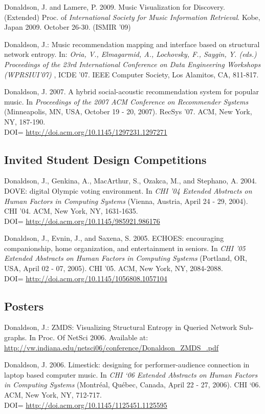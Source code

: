 \documentclass[overlapped,line,letterpaper]{res}
\begin{document}
\begin{resume}
Donaldson, J. and Lamere, P. 2009. Music Visualization for Discovery.  (Extended) Proc. of \emph{International Society for Music Information Retrieval}. Kobe, Japan 2009. October 26-30. (ISMIR '09)

Donaldson, J.: Music recommendation mapping and interface based on structural network entropy. In: \emph{Oria, V., Elmagarmid, A., Lochovsky, F., Saygin, Y. (eds.) Proceedings of the 23rd International Conference on Data Engineering Workshops (WPRSIUI'07) }, ICDE '07. IEEE Computer Society, Los Alamitos, CA, 811-817.

Donaldson, J. 2007. A hybrid social-acoustic recommendation system for popular music. In \emph{Proceedings of the 2007 ACM Conference on Recommender Systems} (Minneapolis, MN, USA, October 19 - 20, 2007). RecSys '07. ACM, New York, NY, 187-190.\\DOI= \url{http://doi.acm.org/10.1145/1297231.1297271}


\subsection{\bf Invited Student Design Competitions}
Donaldson, J., Genkina, A., MacArthur, S., Ozakca, M., and Stephano, A. 2004. DOVE: digital Olympic voting environment. In \emph{CHI '04 Extended Abstracts on Human Factors in Computing Systems} (Vienna, Austria, April 24 - 29, 2004). CHI '04. ACM, New York, NY, 1631-1635. \\DOI= \url{http://doi.acm.org/10.1145/985921.986176}

Donaldson, J., Evnin, J., and Saxena, S. 2005. ECHOES: encouraging companionship, home organization, and entertainment in seniors. In \emph{CHI '05 Extended Abstracts on Human Factors in Computing Systems} (Portland, OR, USA, April 02 - 07, 2005). CHI '05. ACM, New York, NY, 2084-2088. \\DOI= \url{http://doi.acm.org/10.1145/1056808.1057104}



\subsection{\bf Posters}
Donaldson, J.: ZMDS: Visualizing Structural Entropy in Queried Network Sub-graphs.   In Proc. Of NetSci 2006. Available at: \url{http://vw.indiana.edu/netsci06/conference/Donaldson_ZMDS_.pdf}

Donaldson, J. 2006. Limestick: designing for performer-audience connection in laptop based computer music. In \emph{CHI `06 Extended Abstracts on Human Factors in Computing Systems} (Montr\'eal, Qu\'ebec, Canada, April 22 - 27, 2006). CHI `06. ACM, New York, NY, 712-717. \\ DOI= \url{http://doi.acm.org/10.1145/1125451.1125595}




\end{resume}
\end{document}

